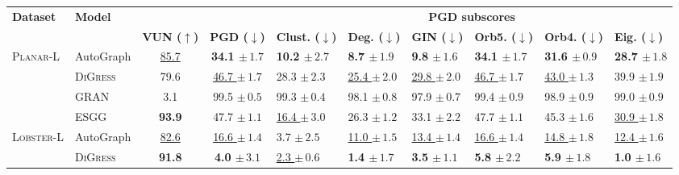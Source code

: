 \begin{tabular}{llccp{1.6cm}p{1.6cm}p{1.6cm}p{1.6cm}p{1.6cm}p{1.6cm}}
\toprule
\textbf{Dataset} & \textbf{Model} &  &  & \multicolumn{6}{c}{\textbf{PGD subscores}} \\
\cmidrule(lr){5-10}
 &  & \textbf{VUN ($\uparrow$)} & \textbf{PGD ($\downarrow$)} & \textbf{Clust. ($\downarrow$)} & \textbf{Deg. ($\downarrow$)} & \textbf{GIN ($\downarrow$)} & \textbf{Orb5. ($\downarrow$)} & \textbf{Orb4. ($\downarrow$)} & \textbf{Eig. ($\downarrow$)} \\
\midrule
\textsc{Planar-L} & AutoGraph & \underline{85.7} & \textbf{34.1 $\pm\,\scriptstyle{1.7}$} & \textbf{10.2 $\pm\,\scriptstyle{2.7}$} & \textbf{8.7 $\pm\,\scriptstyle{1.9}$} & \textbf{9.8 $\pm\,\scriptstyle{1.6}$} & \textbf{34.1 $\pm\,\scriptstyle{1.7}$} & \textbf{31.6 $\pm\,\scriptstyle{0.9}$} & \textbf{28.7 $\pm\,\scriptstyle{1.8}$} \\
 & \textsc{DiGress} & 79.6 & \underline{46.7 $\pm\,\scriptstyle{1.7}$} & 28.3 $\pm\,\scriptstyle{2.3}$ & \underline{25.4 $\pm\,\scriptstyle{2.0}$} & \underline{29.8 $\pm\,\scriptstyle{2.0}$} & \underline{46.7 $\pm\,\scriptstyle{1.7}$} & \underline{43.0 $\pm\,\scriptstyle{1.3}$} & 39.9 $\pm\,\scriptstyle{1.9}$ \\
 & GRAN & 3.1 & 99.5 $\pm\,\scriptstyle{0.5}$ & 99.3 $\pm\,\scriptstyle{0.4}$ & 98.1 $\pm\,\scriptstyle{0.8}$ & 97.9 $\pm\,\scriptstyle{0.7}$ & 99.4 $\pm\,\scriptstyle{0.9}$ & 98.9 $\pm\,\scriptstyle{0.9}$ & 99.0 $\pm\,\scriptstyle{0.9}$ \\
 & ESGG & \textbf{93.9} & 47.7 $\pm\,\scriptstyle{1.1}$ & \underline{16.4 $\pm\,\scriptstyle{3.0}$} & 26.3 $\pm\,\scriptstyle{1.2}$ & 33.1 $\pm\,\scriptstyle{2.2}$ & 47.7 $\pm\,\scriptstyle{1.1}$ & 45.3 $\pm\,\scriptstyle{1.6}$ & \underline{30.9 $\pm\,\scriptstyle{1.8}$} \\
\midrule
\textsc{Lobster-L} & AutoGraph & \underline{82.6} & \underline{16.6 $\pm\,\scriptstyle{1.4}$} & 3.7 $\pm\,\scriptstyle{2.5}$ & \underline{11.0 $\pm\,\scriptstyle{1.5}$} & \underline{13.4 $\pm\,\scriptstyle{1.4}$} & \underline{16.6 $\pm\,\scriptstyle{1.4}$} & \underline{14.8 $\pm\,\scriptstyle{1.8}$} & \underline{12.4 $\pm\,\scriptstyle{1.6}$} \\
 & \textsc{DiGress} & \textbf{91.8} & \textbf{4.0 $\pm\,\scriptstyle{3.1}$} & \underline{2.3 $\pm\,\scriptstyle{0.6}$} & \textbf{1.4 $\pm\,\scriptstyle{1.7}$} & \textbf{3.5 $\pm\,\scriptstyle{1.1}$} & \textbf{5.8 $\pm\,\scriptstyle{2.2}$} & \textbf{5.9 $\pm\,\scriptstyle{1.8}$} & \textbf{1.0 $\pm\,\scriptstyle{1.6}$} \\

\end{tabular}
